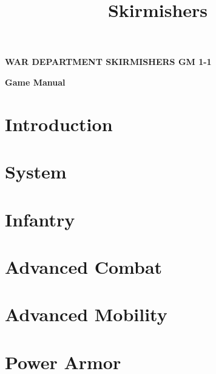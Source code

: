 \documentclass{article}
\title{Skirmishers}
\author{}
\date{}
\newcommand{\mysectiontitle}{}
\newcommand{\newsection}[2]{\renewcommand{\mysectiontitle}{#2}\section{#1}}
\begin{document}
\makeatletter
{}

\begin{center}
  \fontsize{30}{37}\bfseries\selectfont\MakeUppercase{War Department}
  \fontsize{50}{60}\bfseries\selectfont\MakeUppercase{Skirmishers}
  \fontsize{30}{37}\bfseries\selectfont\MakeUppercase{GM 1-1}

  \LARGE\bfseries{Game Manual}
\end{center}

\newsection{Introduction}{introduction}



\newpage

\newsection{System}{system}



\newpage

\newsection{Infantry}{infantry}



\newpage

\newsection{Advanced Combat}{advanced-combat}



\newpage

\newsection{Advanced Mobility}{advanced-mobility}



\newpage

\newsection{Power Armor}{power-armor}


\end{document}
